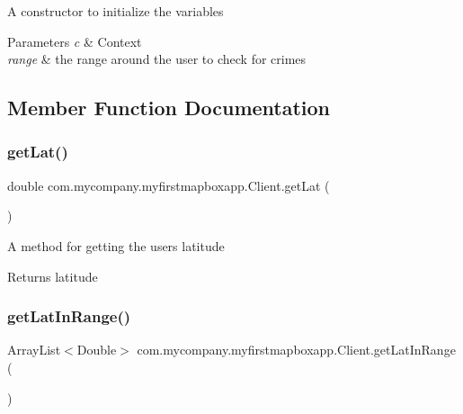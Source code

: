 A constructor to initialize the variables 
\begin{DoxyParams}{Parameters}
{\em c} & Context \\
\hline
{\em range} & the range around the user to check for crimes \\
\hline
\end{DoxyParams}


\subsection{Member Function Documentation}
\mbox{\label{classcom_1_1mycompany_1_1myfirstmapboxapp_1_1_client_af58e5d80e423b077154905841faebb36}} 
\subsubsection{\texorpdfstring{get\+Lat()}{getLat()}}
{\footnotesize\ttfamily double com.\+mycompany.\+myfirstmapboxapp.\+Client.\+get\+Lat (\begin{DoxyParamCaption}{ }\end{DoxyParamCaption})\hspace{0.3cm}{\ttfamily [inline]}}

A method for getting the user\textquotesingle{}s latitude \begin{DoxyReturn}{Returns}
latitude 
\end{DoxyReturn}
\mbox{\label{classcom_1_1mycompany_1_1myfirstmapboxapp_1_1_client_abc6f4428f0d7b67f64eb77caffeb9e7f}} 
\subsubsection{\texorpdfstring{get\+Lat\+In\+Range()}{getLatInRange()}}
{\footnotesize\ttfamily Array\+List$<$Double$>$ com.\+mycompany.\+myfirstmapboxapp.\+Client.\+get\+Lat\+In\+Range (\begin{DoxyParamCaption}{ }\end{DoxyParamCaption})\hspace{0.3cm}{\ttfamily [inline]}}

